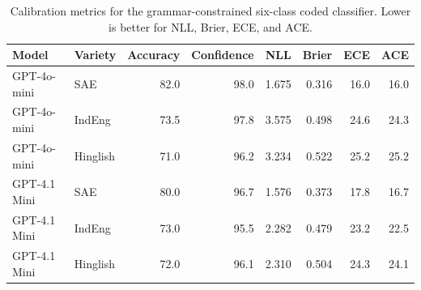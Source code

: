 \begin{table}[t]
\centering
\caption{Calibration metrics for the grammar-constrained six-class coded classifier. Lower is better for NLL, Brier, ECE, and ACE.}
\label{tab:calibration-main}
\small
\begin{tabular}{llrrrrrr}
\toprule
Model & Variety & Accuracy & Confidence & NLL & Brier & ECE & ACE \\
\midrule
GPT-4o-mini & SAE & 82.0 & 98.0 & 1.675 & 0.316 & 16.0 & 16.0 \\
GPT-4o-mini & IndEng & 73.5 & 97.8 & 3.575 & 0.498 & 24.6 & 24.3 \\
GPT-4o-mini & Hinglish & 71.0 & 96.2 & 3.234 & 0.522 & 25.2 & 25.2 \\
\addlinespace
GPT-4.1 Mini & SAE & 80.0 & 96.7 & 1.576 & 0.373 & 17.8 & 16.7 \\
GPT-4.1 Mini & IndEng & 73.0 & 95.5 & 2.282 & 0.479 & 23.2 & 22.5 \\
GPT-4.1 Mini & Hinglish & 72.0 & 96.1 & 2.310 & 0.504 & 24.3 & 24.1 \\
\bottomrule
\end{tabular}
\end{table}
